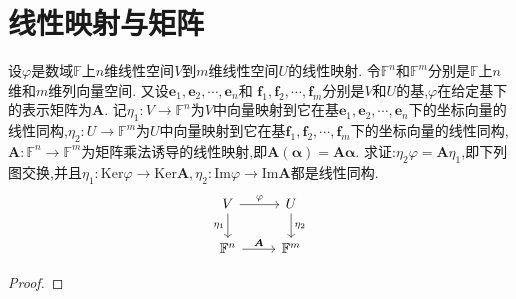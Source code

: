 \documentclass[../../main.tex]{subfiles}%
\begin{document}
\section{线性映射与矩阵}

\begin{theorem}\label{theorem:线性映射与矩阵基本定理}
设\(\varphi\)是数域\(\mathbb{F}\)上\(n\)维线性空间\(V\)到\(m\)维线性空间\(U\)的线性映射. 令\(\mathbb{F}^n\)和\(\mathbb{F}^m\)分别是\(\mathbb{F}\)上\(n\)维和\(m\)维列向量空间. 又设\(\boldsymbol{e}_1,\boldsymbol{e}_2,\cdots,\boldsymbol{e}_n\)和
\(\boldsymbol{f}_1,\boldsymbol{f}_2,\cdots,\boldsymbol{f}_m\)分别是\(V\)和\(U\)的基,\(\varphi\)在给定基下的表示矩阵为\(\boldsymbol{A}\). 记\(\eta_1:V\to\mathbb{F}^n\)为\(V\)中向量映射到它在基\(\boldsymbol{e}_1,\boldsymbol{e}_2,\cdots,\boldsymbol{e}_n\)下的坐标向量的线性同构,\(\eta_2:U\to\mathbb{F}^m\)为\(U\)中向量映射到它在基\(\boldsymbol{f}_1,\boldsymbol{f}_2,\cdots,\boldsymbol{f}_m\)下的坐标向量的线性同构,\(\boldsymbol{A}:\mathbb{F}^n\to\mathbb{F}^m\)为矩阵乘法诱导的线性映射,即\(\boldsymbol{A}(\boldsymbol{\alpha})=\boldsymbol{A}\boldsymbol{\alpha}\). 求证:\(\eta_2\varphi=\boldsymbol{A}\eta_1\),即下列图交换,并且\(\eta_1:\text{Ker}\varphi\to\text{Ker}\boldsymbol{A},\eta_2:\text{Im}\varphi\to\text{Im}\boldsymbol{A}\)都是线性同构.
\[\begin{tikzcd}
V \arrow[r, "\varphi"] \arrow[d, "\eta_1"'] & U \arrow[d, "\eta_2"] \\
\mathbb{F}^n \arrow[r, "\boldsymbol{A}"]    & \mathbb{F}^m         
\end{tikzcd}
\]
\end{theorem}
\begin{proof}

\end{proof}
\end{document}
